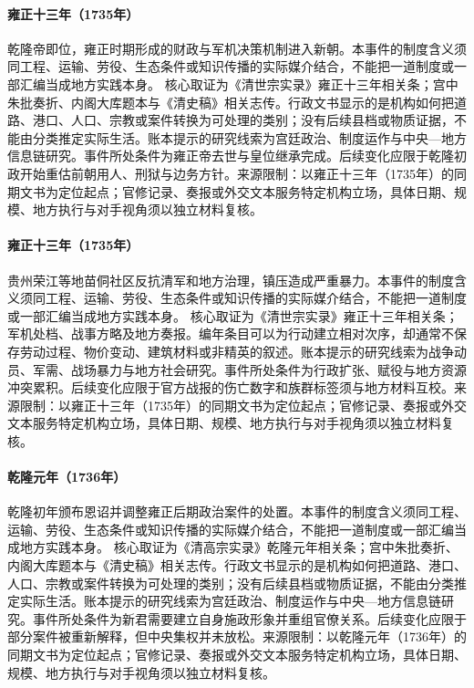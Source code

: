 \hypertarget{civic:EQ-1735-QIANLONG-ACCESSION}{}\paragraph{雍正十三年（1735年）}乾隆帝即位，雍正时期形成的财政与军机决策机制进入新朝。本事件的制度含义须同工程、运输、劳役、生态条件或知识传播的实际媒介结合，不能把一道制度或一部汇编当成地方实践本身。 核心取证为《清世宗实录》雍正十三年相关条；宫中朱批奏折、内阁大库题本与《清史稿》相关志传。行政文书显示的是机构如何把道路、港口、人口、宗教或案件转换为可处理的类别；没有后续县档或物质证据，不能由分类推定实际生活。账本提示的研究线索为宫廷政治、制度运作与中央—地方信息链研究。事件所处条件为雍正帝去世与皇位继承完成。后续变化应限于乾隆初政开始重估前朝用人、刑狱与边务方针。来源限制：以雍正十三年（1735年）的同期文书为定位起点；官修记录、奏报或外交文本服务特定机构立场，具体日期、规模、地方执行与对手视角须以独立材料复核。
\hypertarget{civic:EQ-1735-MIAO-UPRISING-RONGJIANG}{}\paragraph{雍正十三年（1735年）}贵州荣江等地苗侗社区反抗清军和地方治理，镇压造成严重暴力。本事件的制度含义须同工程、运输、劳役、生态条件或知识传播的实际媒介结合，不能把一道制度或一部汇编当成地方实践本身。 核心取证为《清世宗实录》雍正十三年相关条；军机处档、战事方略及地方奏报。编年条目可以为行动建立相对次序，却通常不保存劳动过程、物价变动、建筑材料或非精英的叙述。账本提示的研究线索为战争动员、军需、战场暴力与地方社会研究。事件所处条件为行政扩张、赋役与地方资源冲突累积。后续变化应限于官方战报的伤亡数字和族群标签须与地方材料互校。来源限制：以雍正十三年（1735年）的同期文书为定位起点；官修记录、奏报或外交文本服务特定机构立场，具体日期、规模、地方执行与对手视角须以独立材料复核。
\hypertarget{civic:EQ-1736-AMNESTY-AND-RECTIFICATION}{}\paragraph{乾隆元年（1736年）}乾隆初年颁布恩诏并调整雍正后期政治案件的处置。本事件的制度含义须同工程、运输、劳役、生态条件或知识传播的实际媒介结合，不能把一道制度或一部汇编当成地方实践本身。 核心取证为《清高宗实录》乾隆元年相关条；宫中朱批奏折、内阁大库题本与《清史稿》相关志传。行政文书显示的是机构如何把道路、港口、人口、宗教或案件转换为可处理的类别；没有后续县档或物质证据，不能由分类推定实际生活。账本提示的研究线索为宫廷政治、制度运作与中央—地方信息链研究。事件所处条件为新君需要建立自身施政形象并重组官僚关系。后续变化应限于部分案件被重新解释，但中央集权并未放松。来源限制：以乾隆元年（1736年）的同期文书为定位起点；官修记录、奏报或外交文本服务特定机构立场，具体日期、规模、地方执行与对手视角须以独立材料复核。
